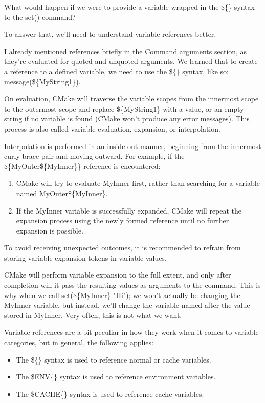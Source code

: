 What would happen if we were to provide a variable wrapped in the \$\{\} syntax to the set() command?

To answer that, we’ll need to understand variable references better.


I already mentioned references briefly in the Command arguments section, as they’re evaluated for quoted and unquoted arguments. We learned that to create a reference to a defined variable, we need to use the \$\{\} syntax, like so: message(\$\{MyString1\}).

On evaluation, CMake will traverse the variable scopes from the innermost scope to the outermost scope and replace \$\{MyString1\} with a value, or an empty string if no variable is found (CMake won’t produce any error messages). This process is also called variable evaluation, expansion, or interpolation.

Interpolation is performed in an inside-out manner, beginning from the innermost curly brace pair and moving outward. For example, if the \$\{MyOuter\$\{MyInner\}\} reference is encountered:

\begin{enumerate}
\item
CMake will try to evaluate MyInner first, rather than searching for a variable named MyOuter\$\{MyInner\}.

\item
If the MyInner variable is successfully expanded, CMake will repeat the expansion process using the newly formed reference until no further expansion is possible.
\end{enumerate}

To avoid receiving unexpected outcomes, it is recommended to refrain from storing variable expansion tokens in variable values.

CMake will perform variable expansion to the full extent, and only after completion will it pass the resulting values as arguments to the command. This is why when we call set(\$\{MyInner\} "Hi"); we won’t actually be changing the MyInner variable, but instead, we’ll change the variable named after the value stored in MyInner. Very often, this is not what we want.

Variable references are a bit peculiar in how they work when it comes to variable categories, but in general, the following applies:

\begin{itemize}
\item
The \$\{\} syntax is used to reference normal or cache variables.

\item
The \$ENV\{\} syntax is used to reference environment variables.

\item
The \$CACHE\{\} syntax is used to reference cache variables.
\end{itemize}

